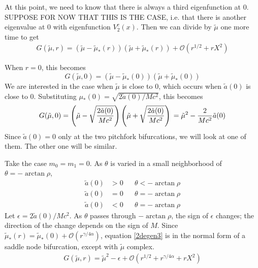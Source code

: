 \documentclass[thesis.tex]{subfiles}
\begin{document}
At this point, we need to know that there is always a third eigenfunction at 0. SUPPOSE FOR NOW THAT THIS IS THE CASE, i.e. that there is another eigenvalue at 0 with eigenfunction $V^c_2(x)$. Then we can divide by $\tilde{\mu}$ one more time to get
\begin{equation}\label{2degen2}
\begin{aligned}
G(\tilde{\mu},r) = (\tilde{\mu} - \tilde{\mu}_*(r))(\tilde{\mu} + \tilde{\mu}_*(r)) + \mathcal{O}( r^{1/2} + rX^2 )
\end{aligned}
\end{equation}

When $r = 0$, this becomes
\[
G(\tilde{\mu},0) = (\tilde{\mu} - \tilde{\mu}_*(0))(\tilde{\mu} + \tilde{\mu}_*(0))
\]
We are interested in the case when $\tilde{\mu}$ is close to 0, which occurs when $\tilde{a}(0)$ is close to 0. Substituting $\mu_*(0) = \sqrt{2 \tilde{a}(0)/M c^2}$, this becomes
\begin{equation*}
G(\tilde{\mu},0) = \left( \tilde{\mu} - \sqrt{\frac{2 \tilde{a}(0)}{M c^2}} \right)\left(\tilde{\mu} +  \sqrt{\frac{2 \tilde{a}(0)}{M c^2}} \right) \\
= \tilde{\mu}^2 - \frac{2}{M c^2}\tilde{a}(0)
\end{equation*}
Since $\tilde{a}(0) = 0$ only at the two pitchfork bifurcations, we will look at one of them. The other one will be similar. 

Take the case $m_0 = m_1 = 0$. As $\theta$ is varied in a small neighborhood of $\theta = -\arctan \rho$,
\begin{align*}
\tilde{a}(0) &> 0 && \theta < -\arctan \rho \\
\tilde{a}(0) &= 0 && \theta = -\arctan \rho \\
\tilde{a}(0) &< 0 && \theta = -\arctan \rho 
\end{align*}
Let $\epsilon = 2 \tilde{a}(0) / M c^2$. As $\theta$ passes through $-\arctan \rho$, the sign of $\epsilon$ changes; the direction of the change depends on the sign of $M$. Since $\tilde{\mu}_*(r) = \tilde{\mu}_*(0) + \mathcal{O}(r^{\gamma/4\alpha})$, equation \cref{2degen3} is in the normal form of a saddle node bifurcation, except with $\tilde{\mu}$ complex.
\begin{equation}\label{2degen3}
\begin{aligned}
G(\tilde{\mu},r) = \tilde{\mu}^2 - \epsilon + \mathcal{O}( r^{1/2} + r^{\gamma/4\alpha} + rX^2 )
\end{aligned}
\end{equation}
\end{document}
